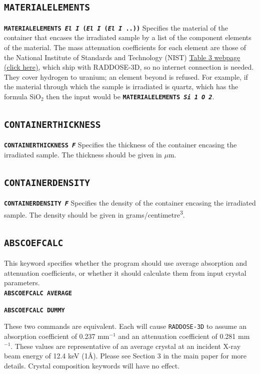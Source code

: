 \documentclass[a4paper]{article}
\newcommand{\RD}{\texttt{RADDOSE-3D}\xspace}
\newcommand{\Keyword}[1]{\texttt{\textbf{#1}}\xspace}
\newcommand{\SB}{\\[0.2em]}
\begin{document}
\subsection{\Keyword{MATERIALELEMENTS}}
\label{materialelements}
\noindent \Keyword{MATERIALELEMENTS \textit{El I} (\textit{El I} (\textit{El I} ..))}
Specifies the material of the container that encases the irradiated sample by a list of the component elements of the material. The mass attenuation coefficients for each element are those of the National Institute of Standards and Technology (NIST) \href{http://physics.nist.gov/PhysRefData/XrayMassCoef/tab3.html}{Table 3 webpage (click here)}, which ship with RADDOSE-3D, so no internet connection is needed. They cover hydrogen to uranium; an element beyond is refused. For example, if the material through which the sample is irradiated is quartz, which has the formula SiO$_2$ then the input would be \Keyword{MATERIALELEMENTS \textit{Si 1 O 2}}.

\subsection{\Keyword{CONTAINERTHICKNESS}}

\noindent \Keyword{CONTAINERTHICKNESS \textit{F}}
Specifies the thickness of the container encasing the irradiated sample. The thickness should be given in $\mu$m.

\subsection{\Keyword{CONTAINERDENSITY}}

\noindent \Keyword{CONTAINERDENSITY \textit{F}}
Specifies the density of the container encasing the irradiated sample. The density should be given in grams/centimetre\textsuperscript{3}.


\newpage
\subsection{\Keyword{ABSCOEFCALC}}
\label{abscoefcalc}
This keyword specifies whether the program should use average absorption and attenuation coefficients, or whether it should calculate them from input crystal parameters.\SB

\noindent \Keyword{ABSCOEFCALC AVERAGE}

\noindent \Keyword{ABSCOEFCALC DUMMY}

These two commands are equivalent. Each will cause \RD to assume an absorption coefficient of 0.237 mm$^{-1}$ and an attenuation coefficient of 0.281 mm$^{-1}$. These values are representative of an average crystal at an incident X-ray beam energy of 12.4 keV (1\AA). Please see Section 3 in the main paper for more details. Crystal composition keywords will have no effect.\SB
\end{document}
